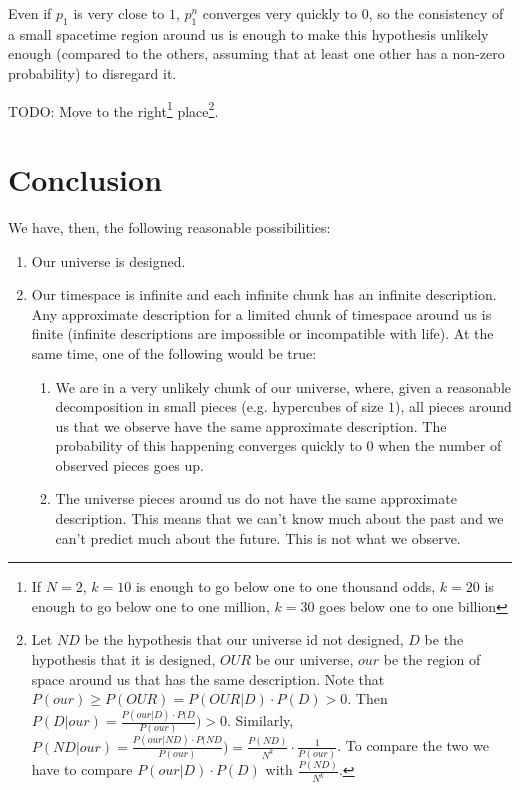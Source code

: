 \documentclass[a4paper
,draft
]{article}
\begin{document}
Even if $p_1$ is very close to $1$, $p_1^n$ converges very quickly to $0$,
so the consistency of a small spacetime region around us is enough
to make this hypothesis unlikely enough (compared to the others, assuming
that at least one other has a non-zero probability) to disregard it.

TODO: Move to the right\footnote{
  If $N=2$, $k=10$ is enough to go below one to one thousand odds,
  $k=20$ is enough to go below one to one million, $k=30$ goes below one to one
  billion
  }
place\footnote{
  Let $ND$ be the hypothesis that our universe id not designed,
  $D$ be the hypothesis that it is designed, $OUR$ be our universe,
  $our$ be the region of space around us that has the same description.
  Note that $P(our) \ge P(OUR)=P(OUR|D)\cdot P(D) > 0$.
  Then $P(D|our) = \frac{P(our|D)\cdot P(D}{P(our)}) > 0$.
  Similarly,
  $P(ND|our) = \frac{P(our|ND)\cdot P(ND}{P(our)})
    = \frac{P(ND)}{N^k} \cdot \frac{1}{P(our)}$.
  To compare the two we have to compare
  $P(our|D)\cdot P(D)$ with $\frac{P(ND)}{N^k}$.
  }.

\section{Conclusion}

We have, then, the following reasonable possibilities:

\begin{enumerate}
\item Our universe is designed.
\item Our timespace is infinite and each infinite chunk has an infinite
      description. Any approximate description for a limited chunk of timespace
      around us is finite (infinite descriptions are impossible or
      incompatible with life). At the same time, one of the following
      would be true:
      \begin{enumerate}
      \item We are in a very unlikely chunk of our universe, where,
            given a reasonable decomposition in small pieces (e.g.
            hypercubes of size $1$), all pieces around us that we observe
            have the same approximate description. The probability
            of this happening converges quickly to $0$ when the number
            of observed pieces goes up.
      \item The universe pieces around us do not have the same
            approximate description. This means that
            we can't know much about the past and we can't
            predict much about the future. This is not what we
            observe.
      \end{enumerate}
\end{enumerate}
\end{document}

